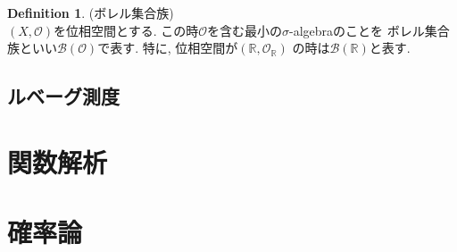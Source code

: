 \documentclass[11pt, a4paper, dvipdfmx]{jsbook}
\theoremstyle{definition}
\newtheorem{Definition+}[Axiom+]{Definition}
\newcommand{\R}{\mathbb{R}}
\begin{document}
\begin{Definition+}(ボレル集合族)\\
  $(X, \mathscr{O})$を位相空間とする. この時$\mathscr{O}$を含む最小の$\sigma$-algebraのことを
  ボレル集合族といい$\mathcal{B}(\mathscr{O})$で表す. 特に, 位相空間が$(\R, \mathscr{O}_{\R})$
  の時は$\mathcal{B}(\mathscr{\R})$と表す.
\end{Definition+}
\section{ルベーグ測度}

\chapter{関数解析}
\chapter{確率論}
\end{document}
